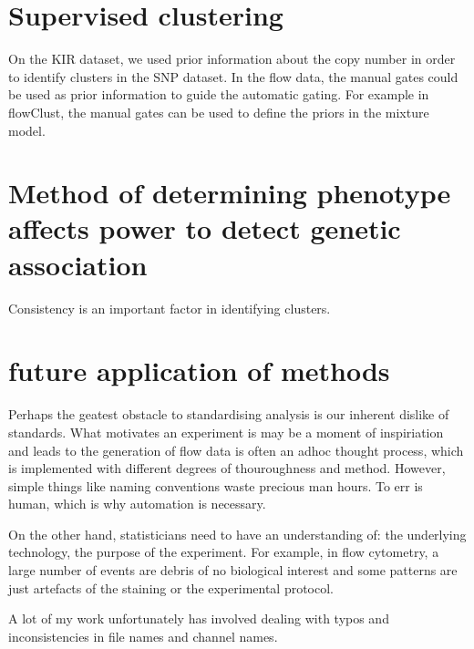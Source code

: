 \section{Supervised clustering}

On the KIR dataset, we used prior information about the copy number in order to identify clusters in the SNP dataset.
In the flow data, the manual gates could be used as prior information to guide the automatic gating.
For example in flowClust, the manual gates can be used to define the priors in the mixture model.

\section{ Method of determining phenotype affects power to detect genetic association }


Consistency is an important factor in identifying clusters.

\section{ future application of methods }

Perhaps the geatest obstacle to standardising analysis is our inherent dislike of standards.
What motivates an experiment is may be a moment of inspiriation and leads to the generation of flow data is often an adhoc thought process,
which is implemented with different degrees of thouroughness and method.
However, simple things like naming conventions waste precious man hours.
To err is human,  which is why automation is necessary.

On the other hand, statisticians need to have an understanding of: the underlying technology, the purpose of the experiment.
For example, in flow cytometry, a large number of events are debris of no biological interest and some patterns are just artefacts of the staining
or the experimental protocol.

A lot of my work unfortunately has involved dealing with typos and inconsistencies in file names and channel names.




